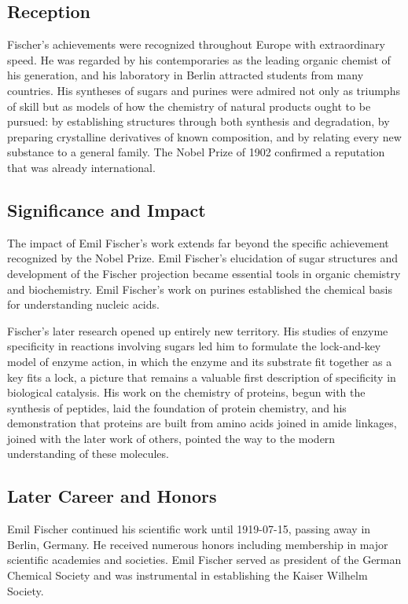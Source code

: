 \subsection*{Reception}

Fischer's achievements were recognized throughout Europe with extraordinary speed. He was regarded by his contemporaries as the leading organic chemist of his generation, and his laboratory in Berlin attracted students from many countries. His syntheses of sugars and purines were admired not only as triumphs of skill but as models of how the chemistry of natural products ought to be pursued: by establishing structures through both synthesis and degradation, by preparing crystalline derivatives of known composition, and by relating every new substance to a general family. The Nobel Prize of 1902 confirmed a reputation that was already international.

\subsection*{Significance and Impact}

The impact of Emil Fischer's work extends far beyond the specific achievement recognized by the Nobel Prize.
Emil Fischer's elucidation of sugar structures and development of the Fischer projection became essential tools in organic chemistry and biochemistry. Emil Fischer's work on purines established the chemical basis for understanding nucleic acids.

Fischer's later research opened up entirely new territory. His studies of enzyme specificity in reactions involving sugars led him to formulate the lock-and-key model of enzyme action, in which the enzyme and its substrate fit together as a key fits a lock, a picture that remains a valuable first description of specificity in biological catalysis. His work on the chemistry of proteins, begun with the synthesis of peptides, laid the foundation of protein chemistry, and his demonstration that proteins are built from amino acids joined in amide linkages, joined with the later work of others, pointed the way to the modern understanding of these molecules.

\subsection*{Later Career and Honors}

Emil Fischer continued his scientific work until 1919-07-15, passing away in Berlin, Germany.
He received numerous honors including membership in major scientific academies and societies.
Emil Fischer served as president of the German Chemical Society and was instrumental in establishing the Kaiser Wilhelm Society.

